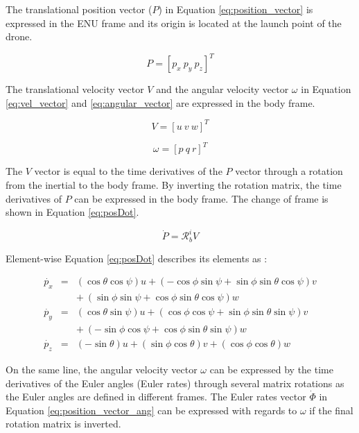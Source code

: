 \noindent The translational position vector ($P$) in Equation \ref{eq:position_vector} is expressed in the ENU frame and its origin is located at the launch point of the drone.

\begin{equation} \label{eq:position_vector}
	P = [p_x\ p_y\ p_z]^T
\end{equation}

\noindent The translational velocity vector $V$ and the angular velocity vector $\omega$ in Equation \ref{eq:vel_vector} and \ref{eq:angular_vector} are expressed in the body frame.  


\begin{equation} \label{eq:vel_vector}
	V = [u\ v\ w]^T
\end{equation}

\begin{equation} \label{eq:angular_vector}
	\omega = [p\ q\ r]^T
\end{equation}

\noindent The $V$ vector is equal to the time derivatives of the $P$ vector through a rotation from the inertial to the body frame. By inverting the rotation matrix, the time derivatives of $P$ can be expressed in the body frame. The change of frame is shown in Equation \ref{eq:posDot}.

\begin{equation} \label{eq:posDot}
	\dot{P} = \mathcal{R}_{b}^{i} {V}
\end{equation}

\noindent Element-wise Equation \ref{eq:posDot} describes its elements as \cite{article:letter}:

\begin{eqnarray}
	\dot{p_x} &= &(\cos \theta \cos \psi) u + (-\cos\phi \sin\psi + \sin\phi \sin\theta \cos\psi) v\\
	&& +\> (\sin\phi \sin\psi + \cos\phi \sin\theta \cos\psi)w \\
	\dot{p_y} &= & (\cos\theta \sin\psi)u + (\cos\phi \cos\psi + \sin\phi \sin\theta\sin\psi)v \\
	&& +\> (-\sin\phi \cos\psi + \cos\phi \sin\theta \sin\psi)w  \\
	\dot{p_z} &= & (-\sin\theta)u + (\sin\phi \cos\theta)v + (\cos\phi \cos\theta)w 
\end{eqnarray}

On the same line, the angular velocity vector $\omega$ can be expressed by the time derivatives of the Euler angles (Euler rates) through several matrix rotations as the Euler angles are defined in different frames. The Euler rates vector $\dot{\Phi}$ in Equation \ref{eq:position_vector_ang} can be expressed with regards to $\omega$ if the final rotation matrix is inverted.

